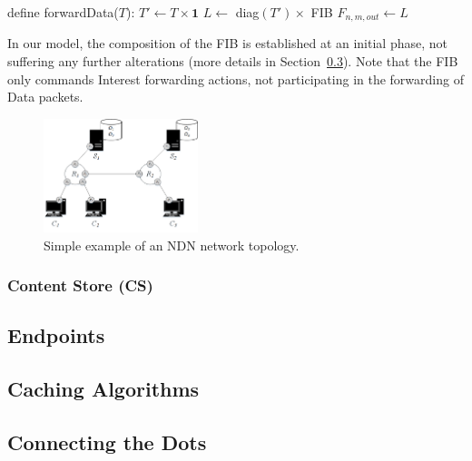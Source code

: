 \begin{algorithmic}[1]

\State define forwardData($T$):
\State
    \State $T' \leftarrow T \times \textbf{1}$
    \State $L \leftarrow$ diag$(T') \times$ FIB
    \State $F_{n,m,out} \leftarrow L$

\end{algorithmic}\shortvertbreak

In our model, the composition of the FIB is established at an initial phase, 
not suffering any further alterations (more details in 
Section~\ref{subsec:meth-conn-dots}). Note 
that the FIB only commands Interest forwarding actions, not participating in the 
forwarding of Data packets.\shortvertbreak

\begin{figure}[h!]

    \centering
    \includegraphics[width=0.40\textwidth]{figures/fib-topo.png}
    \cprotect\caption{Simple example of an NDN network topology.}
    \label{fig:fib-topo}

\end{figure}

\subsubsection{Content Store (CS)}
\label{subsec:meth-cs}

\subsection{Endpoints}
\label{subsec:meth-endpoints}

\subsection{Caching Algorithms}
\label{subsec:meth-caching-algs}

\subsection{Connecting the Dots}
\label{subsec:meth-conn-dots}
